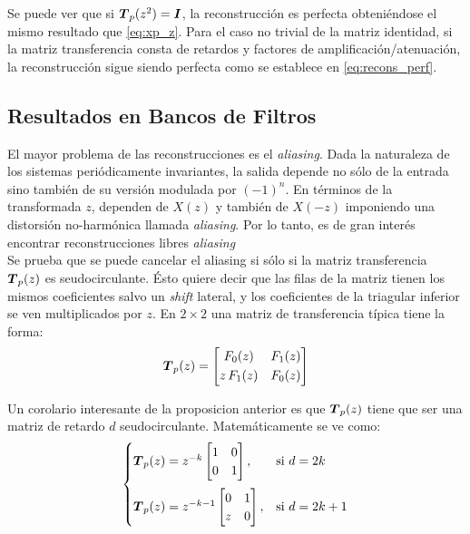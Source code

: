 		Se puede ver que si $\boldsymbol{T}_p(z^2) = \boldsymbol{I}$, la reconstrucción es perfecta obteniéndose el mismo resultado que \eqref{eq:xp_z}. Para el caso no trivial de la matriz identidad, si la matriz transferencia consta de retardos y factores de amplificación/atenuación, la reconstrucción sigue siendo perfecta como se establece en \eqref{eq:recons_perf}.

	\subsection{Resultados en Bancos de Filtros}
	El mayor problema de las reconstrucciones es el \emph{aliasing}. Dada la naturaleza de los sistemas periódicamente invariantes, la salida depende no sólo de la entrada sino también de su versión modulada por $(-1)^n$. En términos de la transformada $z$, dependen de $X(z)$ y también de $X(-z)$ imponiendo una distorsión no-harmónica llamada \emph{aliasing}. Por lo tanto, es de gran interés encontrar reconstrucciones libres \emph{aliasing}\\

		Se prueba que se puede cancelar el aliasing si sólo si la matriz transferencia $\boldsymbol{T}_p(z)$ es seudocirculante. Ésto quiere decir que las filas de la matriz tienen los mismos coeficientes salvo un \emph{shift} lateral, y los coeficientes de la triagular inferior se ven multiplicados por $z$. En $2\times 2$ una matriz de transferencia típica tiene la forma:
		\begin{equation*}
		\boldsymbol{T}_p(z) = \begin{bmatrix} F_0 (z) & F_1(z) \\[0.3em] z\, F_1(z) & F_0(z) \end{bmatrix}
		\end{equation*}
			
		Un corolario interesante de la proposicion anterior es que $\boldsymbol{T}_p(z)$ tiene que ser una matriz de retardo $d$ seudocirculante. Matemáticamente se ve como:
		\begin{equation*}
		\begin{cases}\boldsymbol{T}_p(z)=z^{-k}\begin{bmatrix}1&0\\0&1\end{bmatrix}, &\text{si }d=2k \\[0.5cm]
		\boldsymbol{T}_p(z)=z^{-k-1}\begin{bmatrix}0&1\\z&0\end{bmatrix}, &\text{si }d=2k+1\end{cases}
		\end{equation*}

